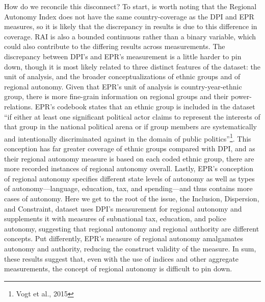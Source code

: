 \documentclass[12pt]{article}
\begin{document}
How do we reconcile this disconnect? To start, is worth noting that the Regional Autonomy Index does not have the same country-coverage as the DPI and EPR measures, so it is likely that the discrepancy in results is due to this difference in coverage. RAI is also a bounded continuous rather than a binary variable, which could also contribute to the differing results across measurements. The discrepancy between DPI's and EPR's measurement is a little harder to pin down, though it is most likely related to three distinct features of the dataset: the unit of analysis, and the broader conceptualizations of ethnic groups and of regional autonomy. Given that EPR's unit of analysis is country-year-ethnic group, there is more fine-grain information on regional groups and their power-relations. EPR's codebook states that an ethnic group is included in the dataset ``if either at least one significant political actor claims to represent the interests of that group in the national political arena or if group members are systematically and intentionally discriminated against in the domain of public politics''\footnote{Vogt et al., 2015}. This conception has far greater coverage of ethnic groups compared with DPI, and as their regional autonomy measure is based on each coded ethnic group, there are more recorded instances of regional autonomy overall. Lastly, EPR's conception of regional autonomy specifies different state levels of autonomy as well as types of autonomy---language, education, tax, and spending---and thus contains more cases of autonomy. Here we get to the root of the issue, the Inclusion, Dispersion, and Constraint, dataset uses DPI's measurement for regional autonomy and supplements it with measures of subnational tax, education, and police autonomy, suggesting that regional autonomy and regional authority are different concepts. Put differently, EPR's measure of regional autonomy amalgamates autonomy and authority, reducing the construct validity of the measure. In sum, these results suggest that, even with the use of indices and other aggregate measurements, the concept of regional autonomy is difficult to pin down. 
\end{document}
